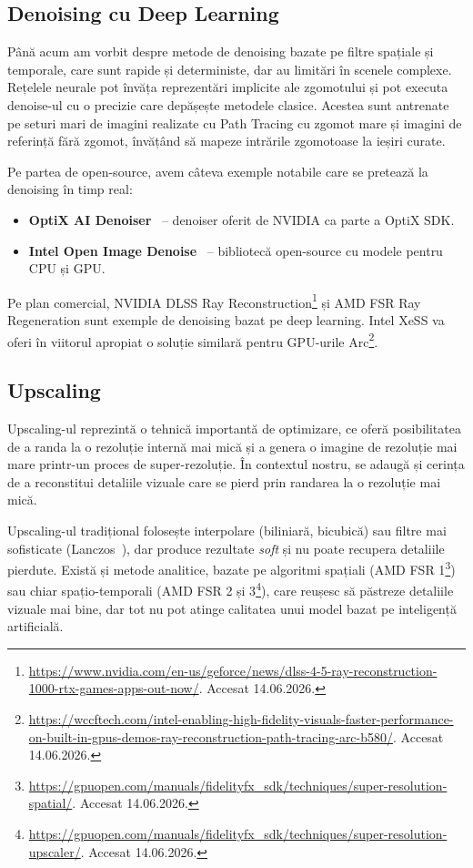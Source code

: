 \documentclass[12pt,a4paper]{report}
\numberwithin{equation}{section} %
\begin{document}
\subsection{Denoising cu Deep Learning}

Până acum am vorbit despre metode de denoising bazate pe filtre spațiale și temporale, care sunt rapide și deterministe, dar au limitări în scenele complexe.
Rețelele neurale pot învăța reprezentări implicite ale zgomotului și pot executa denoise-ul cu o precizie care depășește metodele clasice.
Acestea sunt antrenate pe seturi mari de imagini realizate cu Path Tracing cu zgomot mare și imagini de referință fără zgomot, învățând să mapeze intrările zgomotoase la ieșiri curate.

Pe partea de open-source, avem câteva exemple notabile care se pretează la denoising în timp real:
\begin{itemize}
	\item \textbf{OptiX AI Denoiser}~\cite{optix2017} -- denoiser oferit de NVIDIA ca parte a OptiX SDK.
	\item \textbf{Intel Open Image Denoise}~\cite{OpenImageDenoise} -- bibliotecă open-source cu modele pentru CPU și GPU.
\end{itemize}

Pe plan comercial, NVIDIA DLSS Ray Reconstruction\footnote{\url{https://www.nvidia.com/en-us/geforce/news/dlss-4-5-ray-reconstruction-1000-rtx-games-apps-out-now/}. Accesat 14.06.2026.} și AMD FSR Ray Regeneration sunt exemple de denoising bazat pe deep learning.
Intel XeSS va oferi în viitorul apropiat o soluție similară pentru GPU-urile Arc\footnote{\url{https://wccftech.com/intel-enabling-high-fidelity-visuals-faster-performance-on-built-in-gpus-demos-ray-reconstruction-path-tracing-arc-b580/}. Accesat 14.06.2026.}.

\subsection{Upscaling}

Upscaling-ul reprezintă o tehnică importantă de optimizare, ce oferă posibilitatea de a randa la o rezoluție internă mai mică și a genera o imagine de rezoluție mai mare printr-un proces de super-rezoluție.
În contextul nostru, se adaugă și cerința de a reconstitui detaliile vizuale care se pierd prin randarea la o rezoluție mai mică.

Upscaling-ul tradițional folosește interpolare (biliniară, bicubică) sau filtre mai sofisticate (Lanczos~\cite{duchon1979lanczos}), dar produce rezultate \textit{soft} și nu poate recupera detaliile pierdute.
Există și metode analitice, bazate pe algoritmi spațiali (AMD FSR 1\footnote{\url{https://gpuopen.com/manuals/fidelityfx_sdk/techniques/super-resolution-spatial/}. Accesat 14.06.2026.}) sau chiar spațio-temporali (AMD FSR 2 și 3\footnote{\url{https://gpuopen.com/manuals/fidelityfx_sdk/techniques/super-resolution-upscaler/}. Accesat 14.06.2026.}), care reușesc să păstreze detaliile vizuale mai bine, dar tot nu pot atinge calitatea unui model bazat pe inteligență artificială.
\end{document}

